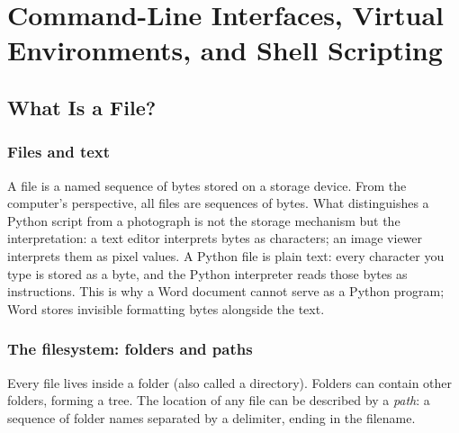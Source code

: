 

\chapter{Command-Line Interfaces, Virtual Environments,
         and Shell Scripting}
\label{ch:cli-scripting}

\section{What Is a File?}
\label{sec:what-is-a-file}

\subsection{Files and text}

A file is a named sequence of bytes stored on a storage device. From the
computer's perspective, all files are sequences of bytes. What distinguishes
a Python script from a photograph is not the storage mechanism but the
interpretation: a text editor interprets bytes as characters; an image
viewer interprets them as pixel values. A Python file is plain text: every
character you type is stored as a byte, and the Python interpreter reads
those bytes as instructions. This is why a Word document cannot serve as a
Python program; Word stores invisible formatting bytes alongside the text.

\subsection{The filesystem: folders and paths}

Every file lives inside a folder (also called a directory). Folders can
contain other folders, forming a tree. The location of any file can be
described by a \emph{path}: a sequence of folder names separated by a
delimiter, ending in the filename.

